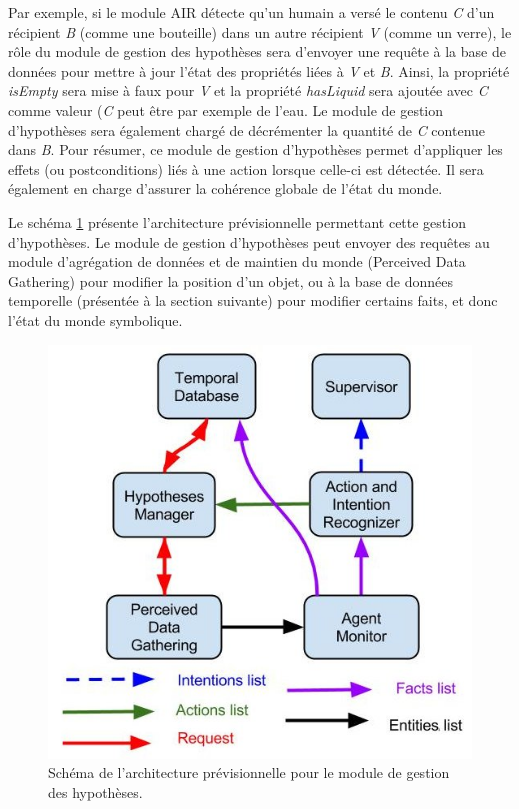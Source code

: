 \documentclass[a4paper,11pt,twoside]{StyleThese}
\begin{document}
Par exemple, si le module AIR détecte qu'un humain a versé le contenu \textit{C} d'un récipient \textit{B} (comme une bouteille) dans un autre récipient \textit{V} (comme un verre), le rôle du module de gestion des hypothèses sera d'envoyer une requête à la base de données pour mettre à jour l'état des propriétés liées à \textit{V} et \textit{B}. Ainsi, la propriété \textit{isEmpty} sera mise à faux pour \textit{V} et la propriété \textit{hasLiquid} sera ajoutée avec \textit{C} comme valeur (\textit{C} peut être par exemple de l'eau. Le module de gestion d'hypothèses sera également chargé de décrémenter la quantité de \textit{C} contenue dans \textit{B}.
Pour résumer, ce module de gestion d'hypothèses permet d'appliquer les effets (ou postconditions) liés à une action lorsque celle-ci est détectée. Il sera également en charge d'assurer la cohérence globale de l'état du monde.


Le schéma \ref{fig:hypo} présente l'architecture prévisionnelle permettant cette gestion d'hypothèses. Le module de gestion d'hypothèses peut envoyer des requêtes au module d'agrégation de données et de maintien du monde (Perceived Data Gathering) pour modifier la position d'un objet, ou à la base de données temporelle (présentée à la section suivante) pour modifier certains faits, et donc l'état du monde symbolique.

\begin{figure}[ht!]
 \centering
  \includegraphics[width=0.7\linewidth]{./img/hypotheses_manager.jpg} 
  \caption {Schéma de l'architecture prévisionnelle pour le module de gestion des hypothèses.}
  \label{fig:hypo}
\end{figure}
\end{document}
